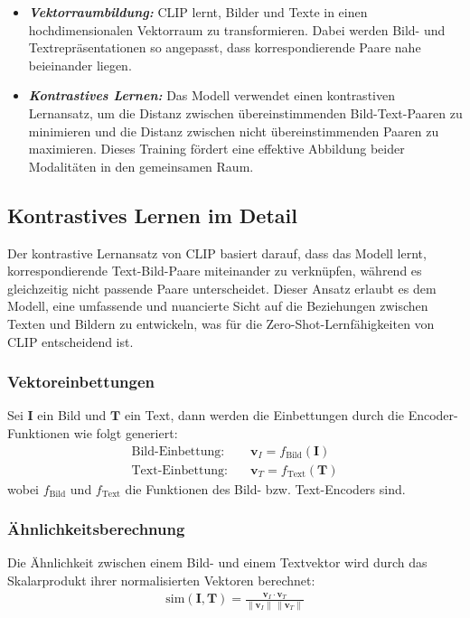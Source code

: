 \documentclass[nolibertine, ngerman, algorithm, nomencl, minted]{ttlab-qualify}
\begin{document}
\begin{itemize}
	\item \textbf{\textit{Vektorraumbildung: }} CLIP lernt, Bilder und Texte in einen hochdimensionalen Vektorraum zu transformieren. Dabei werden Bild- und Textrepräsentationen so angepasst, dass korrespondierende Paare nahe beieinander liegen.
	\item \textbf{\textit{Kontrastives Lernen: }}Das Modell verwendet einen kontrastiven Lernansatz, um die Distanz zwischen übereinstimmenden Bild-Text-Paaren zu minimieren und die Distanz zwischen nicht übereinstimmenden Paaren zu maximieren. Dieses Training fördert eine effektive Abbildung beider Modalitäten in den gemeinsamen Raum.
\end{itemize}

\subsection{Kontrastives Lernen im Detail}
Der kontrastive Lernansatz von CLIP basiert darauf, dass das Modell
lernt, korrespondierende Text-Bild-Paare miteinander zu verknüpfen,
während es gleichzeitig nicht passende Paare unterscheidet. Dieser
Ansatz erlaubt es dem Modell, eine umfassende und nuancierte Sicht
auf die Beziehungen zwischen Texten und Bildern zu entwickeln, was für die 
Zero-Shot-Lernfähigkeiten von CLIP entscheidend ist.


\subsubsection{Vektoreinbettungen}
Sei \( \textbf{I} \) ein Bild und \( \textbf{T} \) ein Text, dann werden die Einbettungen durch die Encoder-Funktionen wie folgt generiert:
\begin{align*}
\text{Bild-Einbettung:} \quad & \textbf{v}_I = f_{\text{Bild}}(\textbf{I}) \\
\text{Text-Einbettung:} \quad & \textbf{v}_T = f_{\text{Text}}(\textbf{T})
\end{align*}
wobei \( f_{\text{Bild}} \) und \( f_{\text{Text}} \) die Funktionen des Bild- bzw. Text-Encoders sind.

\subsubsection{Ähnlichkeitsberechnung}
Die Ähnlichkeit zwischen einem Bild- und einem Textvektor wird durch das Skalarprodukt ihrer normalisierten Vektoren berechnet:
\begin{align*}
\text{sim}(\textbf{I}, \textbf{T}) = \frac{\textbf{v}_I \cdot \textbf{v}_T}{\| \textbf{v}_I \| \, \| \textbf{v}_T \|}
\end{align*}
\end{document}

